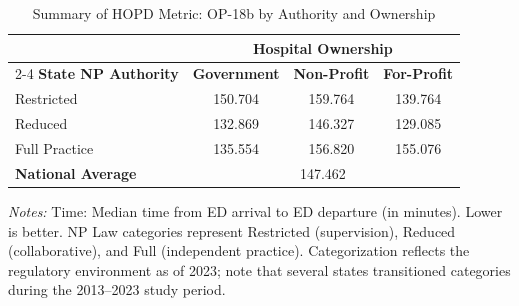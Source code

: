 \begin{table}[htbp]
    \centering
    \caption{Summary of HOPD Metric: OP-18b by Authority and Ownership}
    \label{tab:hopd_op_18b}
    \vspace{0.2cm}
    \begin{tabular}{lccc}
        \toprule
        & \multicolumn{3}{c}{\textbf{Hospital Ownership}} \\
        \cmidrule(lr){2-4}
        \textbf{State NP Authority} & \textbf{Government} & \textbf{Non-Profit} & \textbf{For-Profit} \\
        \midrule
        Restricted & 150.704 & 159.764 & 139.764 \\
        Reduced & 132.869 & 146.327 & 129.085 \\
        Full Practice & 135.554 & 156.820 & 155.076 \\
        \midrule
        \textbf{National Average} & \multicolumn{3}{c}{147.462} \\
        \bottomrule
    \end{tabular}
    \vspace{0.1cm}
    \begin{minipage}{0.85\textwidth}
        \footnotesize \textit{Notes:} Time: Median time from ED arrival to ED departure (in minutes). Lower is better. NP Law categories represent Restricted (supervision), Reduced (collaborative), and Full (independent practice). Categorization reflects the regulatory environment as of 2023; note that several states transitioned categories during the 2013--2023 study period.
    \end{minipage}
\end{table}